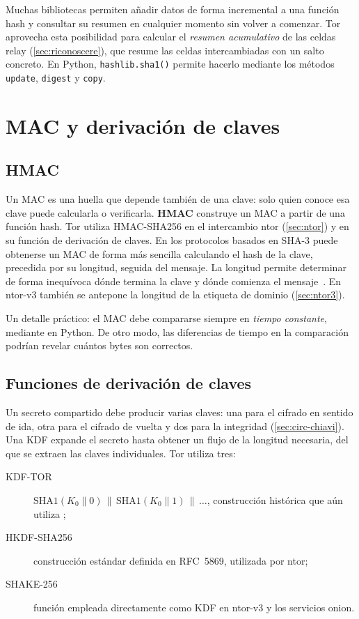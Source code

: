 \begin{approfondimento}
Muchas bibliotecas permiten añadir datos de forma incremental a una función hash y consultar su resumen en cualquier momento sin volver a comenzar. Tor aprovecha esta posibilidad para calcular el \emph{resumen acumulativo} de las celdas relay (\cref{sec:riconoscere}), que resume las celdas intercambiadas con un salto concreto. En Python, \texttt{hashlib.sha1()} permite hacerlo mediante los métodos \texttt{update}, \texttt{digest} y \texttt{copy}.
\end{approfondimento}

\section{MAC y derivación de claves}\label{sec:cripto-mac}

\subsection{HMAC}

Un MAC es una huella que depende también de una clave: solo quien conoce esa clave puede calcularla o verificarla. \textbf{HMAC} construye un MAC a partir de una función hash. Tor utiliza HMAC-SHA256 en el intercambio ntor (\cref{sec:ntor}) y en su función de derivación de claves. En los protocolos basados en SHA-3 puede obtenerse un MAC de forma más sencilla calculando el hash de la clave, precedida por su longitud, seguida del mensaje. La longitud permite determinar de forma inequívoca dónde termina la clave y dónde comienza el mensaje~. En ntor-v3 también se antepone la longitud de la etiqueta de dominio (\cref{sec:ntor3}).

Un detalle práctico: el MAC debe compararse siempre en \emph{tiempo constante}, mediante  en Python. De otro modo, las diferencias de tiempo en la comparación podrían revelar cuántos bytes son correctos.

\subsection{Funciones de derivación de claves}

Un secreto compartido debe producir varias claves: una para el cifrado en sentido de ida, otra para el cifrado de vuelta y dos para la integridad (\cref{sec:circ-chiavi}). Una KDF expande el secreto hasta obtener un flujo de la longitud necesaria, del que se extraen las claves individuales. Tor utiliza tres:
\begin{description}
  \item[KDF-TOR] $\mathrm{SHA1}(K_0 \| 0) \,\|\, \mathrm{SHA1}(K_0 \| 1) \,\|\, \ldots$, construcción histórica que aún utiliza ;
  \item[HKDF-SHA256] construcción estándar definida en RFC~5869, utilizada por ntor;
  \item[SHAKE-256] función empleada directamente como KDF en ntor-v3 y los servicios onion.
\end{description}

